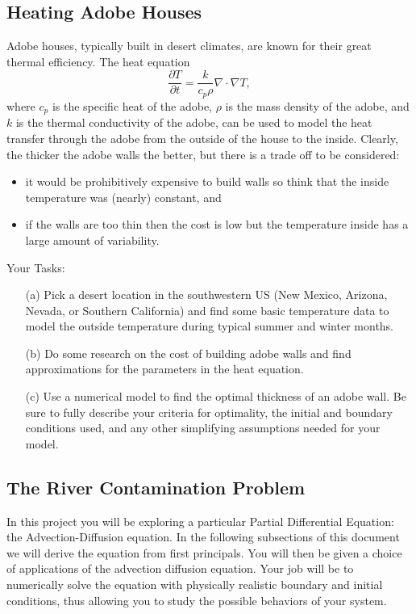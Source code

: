 \newpage\subsection{Heating Adobe Houses}
Adobe houses, typically built in desert climates, are known for their great thermal
efficiency.  The heat equation 
\[ \frac{\partial T}{\partial t} = \frac{k}{c_p \rho} \nabla \cdot \nabla T, \]
where $c_p$ is the specific heat of the adobe, $\rho$ is the mass density of the
adobe, and $k$ is the thermal conductivity of the adobe, can be used to model the heat
transfer through the adobe from the outside of the house to the inside.  Clearly, the
thicker the adobe walls the better, but there is a trade off to be considered: 
\begin{itemize}
    \item it would be prohibitively expensive to build walls so think that the inside
        temperature was (nearly) constant, and 
    \item if the walls are too thin then the cost is low but the temperature inside
        has a large amount of variability.  
\end{itemize}
Your Tasks:
\begin{enumerate}
    \item[(a)] Pick a desert location in the southwestern US (New Mexico, Arizona, Nevada, or
        Southern California) and find some basic temperature data to model the outside
        temperature during typical summer and winter months.
    \item[(b)] Do some research on the cost of building adobe walls and find approximations for the
        parameters in the heat equation.
    \item[(c)] Use a numerical model to find the optimal thickness of an adobe wall.
        Be sure to fully describe your criteria for optimality, the initial and
        boundary conditions used, and any other simplifying assumptions needed for your model.
\end{enumerate}

\newpage\subsection{The River Contamination Problem}
In this project you will be exploring a particular Partial Differential Equation: the
Advection-Diffusion equation.  In the following subsections of this document we will
derive the equation from first principals.  You will then be given a choice of
applications of the advection diffusion equation.  Your job will be to numerically solve
the equation with physically realistic boundary and initial conditions, thus allowing you
to study the possible behaviors of your system.  

